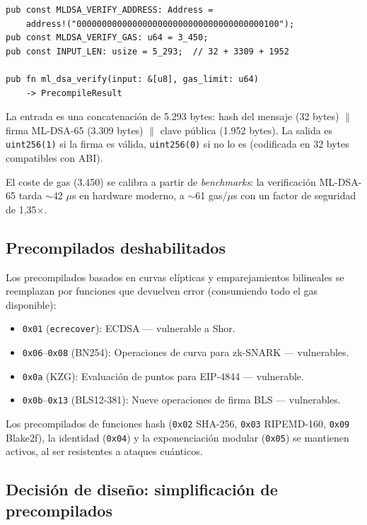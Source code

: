 \begin{lstlisting}[style=rustcode, caption={Precompilado de verificación ML-DSA-65.}, label={lst:precompile}]
pub const MLDSA_VERIFY_ADDRESS: Address =
    address!("0000000000000000000000000000000000000100");
pub const MLDSA_VERIFY_GAS: u64 = 3_450;
pub const INPUT_LEN: usize = 5_293;  // 32 + 3309 + 1952

pub fn ml_dsa_verify(input: &[u8], gas_limit: u64)
    -> PrecompileResult
\end{lstlisting}

La entrada es una concatenación de 5.293 bytes: hash del mensaje (32 bytes) $\|$ firma ML-DSA-65 (3.309 bytes) $\|$ clave pública (1.952 bytes). La salida es \texttt{uint256(1)} si la firma es válida, \texttt{uint256(0)} si no lo es (codificada en 32 bytes compatibles con ABI).

El coste de gas (3.450) se calibra a partir de \emph{benchmarks}: la verificación ML-DSA-65 tarda $\sim$42 $\mu$s en hardware moderno, a $\sim$61 gas/$\mu$s con un factor de seguridad de 1,35$\times$.

\subsection{Precompilados deshabilitados}
\label{sec:precompilados_off}

Los precompilados basados en curvas elípticas y emparejamientos bilineales se reemplazan por funciones que devuelven error (consumiendo todo el gas disponible):

\begin{itemize}
  \item \texttt{0x01} (\texttt{ecrecover}): ECDSA --- vulnerable a Shor.
  \item \texttt{0x06}--\texttt{0x08} (BN254): Operaciones de curva para zk-SNARK --- vulnerables.
  \item \texttt{0x0a} (KZG): Evaluación de puntos para EIP-4844 --- vulnerable.
  \item \texttt{0x0b}--\texttt{0x13} (BLS12-381): Nueve operaciones de firma BLS --- vulnerables.
\end{itemize}

Los precompilados de funciones hash (\texttt{0x02} SHA-256, \texttt{0x03} RIPEMD-160, \texttt{0x09} Blake2f), la identidad (\texttt{0x04}) y la exponenciación modular (\texttt{0x05}) se mantienen activos, al ser resistentes a ataques cuánticos.

\subsection{Decisión de diseño: simplificación de precompilados}
\label{sec:precompile_decision}

